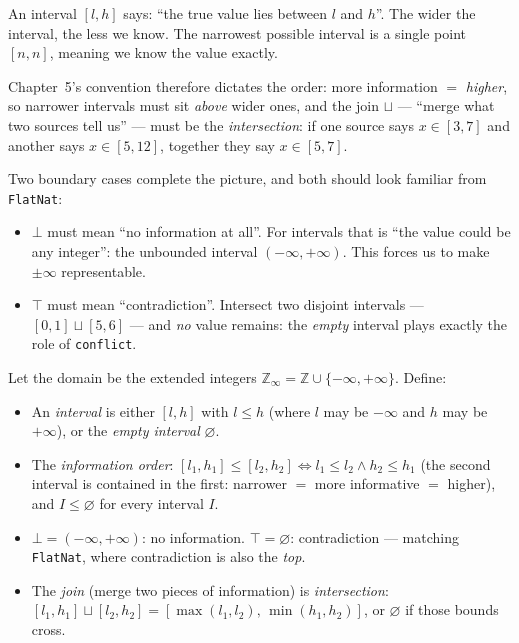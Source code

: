 \documentclass[12pt, a4paper, openright]{book}
\theoremstyle{thmstyle}
\theoremstyle{defstyle}
\newcommand{\lc}[1]{\texttt{#1}}
\newenvironment{defbox}[1][]{%
  \begin{tcolorbox}[defbox, title={Definition\ifx\\#1\\\else\ --- #1\fi}]%
}{\end{tcolorbox}}
\begin{document}
An interval $[l, h]$ says: ``the true value lies between $l$ and $h$''. The
wider the interval, the less we know. The narrowest possible interval is a
single point $[n, n]$, meaning we know the value exactly.

Chapter~5's convention therefore dictates the order: more information $=$
\emph{higher}, so narrower intervals must sit \emph{above} wider ones, and
the join $\sqcup$ --- ``merge what two sources tell us'' --- must be the
\emph{intersection}: if one source says $x \in [3, 7]$ and another says
$x \in [5, 12]$, together they say $x \in [5, 7]$.

Two boundary cases complete the picture, and both should look familiar from
\lc{FlatNat}:
\begin{itemize}
  \item $\bot$ must mean ``no information at all''. For intervals that is
    ``the value could be any integer'': the unbounded interval
    $(-\infty, +\infty)$. This forces us to make $\pm\infty$ representable.
  \item $\top$ must mean ``contradiction''. Intersect two disjoint intervals
    --- $[0,1] \sqcup [5,6]$ --- and \emph{no} value remains: the
    \emph{empty} interval plays exactly the role of \lc{conflict}.
\end{itemize}

\begin{defbox}[Interval Lattice]
  Let the domain be the extended integers $\mathbb{Z}_\infty = \mathbb{Z}
  \cup \{-\infty, +\infty\}$. Define:
  \begin{itemize}[nosep]
    \item An \emph{interval} is either $[l, h]$ with $l \leq h$ (where $l$
          may be $-\infty$ and $h$ may be $+\infty$), or the \emph{empty
          interval} $\varnothing$.
    \item The \emph{information order}: $[l_1, h_1] \leq [l_2, h_2] \iff
          l_1 \leq l_2 \wedge h_2 \leq h_1$ (the second interval is contained
          in the first: narrower $=$ more informative $=$ higher), and
          $I \leq \varnothing$ for every interval $I$.
    \item $\bot = (-\infty, +\infty)$: no information.
          $\top = \varnothing$: contradiction --- matching \lc{FlatNat},
          where contradiction is also the \emph{top}.
    \item The \emph{join} (merge two pieces of information) is
          \emph{intersection}:
          $[l_1, h_1] \sqcup [l_2, h_2] =
          [\max(l_1,l_2),\, \min(h_1,h_2)]$, or $\varnothing$ if those
          bounds cross.
  \end{itemize}
\end{defbox}
\end{document}
